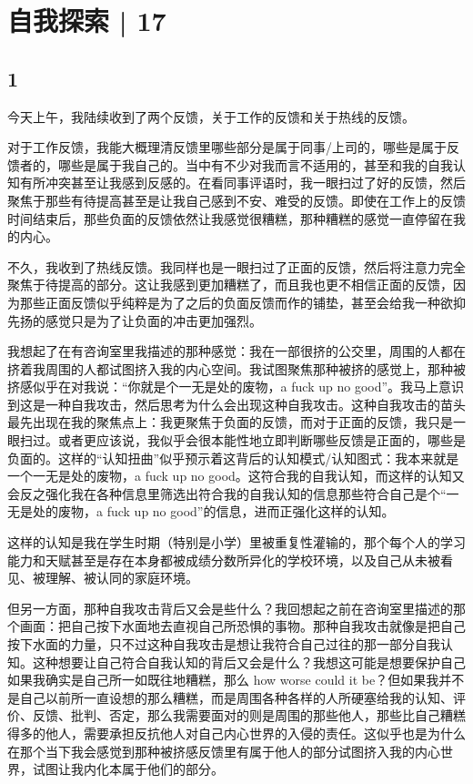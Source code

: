 \chapter{自我探索 | 17}



\section*{1}

今天上午，我陆续收到了两个反馈，关于工作的反馈和关于热线的反馈。

对于工作反馈，我能大概理清反馈里哪些部分是属于同事/上司的，哪些是属于反馈者的，哪些是属于我自己的。当中有不少对我而言不适用的，甚至和我的自我认知有所冲突甚至让我感到反感的。在看同事评语时，我一眼扫过了好的反馈，然后聚焦于那些有待提高甚至是让我自己感到不安、难受的反馈。即使在工作上的反馈时间结束后，那些负面的反馈依然让我感觉很糟糕，那种糟糕的感觉一直停留在我的内心。

不久，我收到了热线反馈。我同样也是一眼扫过了正面的反馈，然后将注意力完全聚焦于待提高的部分。这让我感到更加糟糕了，而且我也更不相信正面的反馈，因为那些正面反馈似乎纯粹是为了之后的负面反馈而作的铺垫，甚至会给我一种欲抑先扬的感觉\pozhehao{}只是为了让负面的冲击更加强烈。

我想起了在有咨询室里我描述的那种感觉：我在一部很挤的公交里，周围的人都在挤着我\pozhehao{}周围的人都试图挤入我的内心空间。我试图聚焦那种被挤的感觉上，那种被挤感似乎在对我说：“你就是个一无是处的废物，a fuck up no good”。我马上意识到这是一种自我攻击，然后思考为什么会出现这种自我攻击。这种自我攻击的苗头最先出现在我的聚焦点上：我更聚焦于负面的反馈，而对于正面的反馈，我只是一眼扫过。或者更应该说，我似乎会很本能性地立即判断哪些反馈是正面的，哪些是负面的。这样的“认知扭曲”似乎预示着这背后的认知模式/认知图式：我本来就是一个一无是处的废物，a fuck up no good。这符合我的自我认知，而这样的认知又会反之强化我在各种信息里筛选出符合我的自我认知的信息\pozhehao{}那些符合自己是个“一无是处的废物，a fuck up no good”的信息，进而正强化这样的认知。

这样的认知是我在学生时期（特别是小学）里被重复性灌输的，那个每个人的学习能力和天赋甚至是存在本身都被成绩分数所异化的学校环境，以及自己从未被看见、被理解、被认同的家庭环境。

但另一方面，那种自我攻击背后又会是些什么？我回想起之前在咨询室里描述的那个画面：把自己按下水面地去直视自己所恐惧的事物。那种自我攻击就像是把自己按下水面的力量，只不过这种自我攻击是想让我符合自己过往的那一部分自我认知。这种想要让自己符合自我认知的背后又会是什么？我想这可能是想要保护自己\pozhehao{}如果我确实是自己所一如既往地糟糕，那么 how worse could it be？但如果我并不是自己以前所一直设想的那么糟糕，而是周围各种各样的人所硬塞给我的认知、评价、反馈、批判、否定，那么我需要面对的则是周围的那些他人，那些比自己糟糕得多的他人，需要承担反抗他人对自己内心世界的入侵的责任。这似乎也是为什么在那个当下我会感觉到那种被挤感\pozhehao{}反馈里有属于他人的部分试图挤入我的内心世界，试图让我内化本属于他们的部分。


